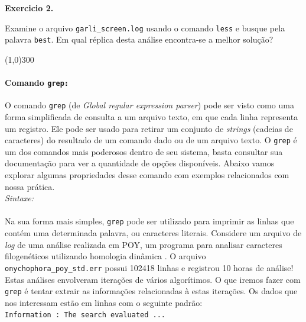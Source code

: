 \begin{refsection}
\begin{blackBlock}{\textbf{Exercicio 2.}}\label{tut2:ex:2.\arabic{ex}}

Examine o arquivo \texttt{garli\_screen.log} usando o comando \texttt{less} e busque pela palavra \texttt{best}. Em qual réplica desta análise encontra-se a melhor solução?
\begin{center}
\line(1,0){300}\\
\end{center}

\end{blackBlock}

\paragraph{Comando \texttt{grep:}}\label{tut2:text:editors:texttools:grep}

O comando \texttt{grep} (de \textit{Global regular expression parser}) pode ser visto como uma forma simplificada de consulta a um arquivo texto, em que cada linha representa um registro. Ele pode ser usado para retirar um conjunto de \textit{strings} (cadeias de caracteres) do resultado de um comando dado ou de um arquivo texto. O \texttt{grep} é um dos comandos mais poderosos dentro de seu sistema, basta consultar sua documentação para ver a quantidade de opções disponíveis. Abaixo vamos explorar algumas propriedades desse comando com exemplos relacionados com nossa prática.\\
\textit{Sintaxe:}\\
 \\

Na sua forma mais simples, \texttt{grep} pode ser utilizado para imprimir as linhas que contém uma determinada palavra, ou caracteres literais. Considere um arquivo de \textit{log} de uma análise realizada em POY, um programa para analisar caracteres filogenéticos utilizando homologia dinâmica \parencite{VaronETAL_2010}. O arquivo \texttt{onychophora\_poy\_std.err} possui 102418 linhas e registrou 10 horas de análise! Estas análises envolveram iterações de vários algorítimos. O que iremos fazer com \texttt{grep} é tentar extrair as informações relacionadas à estas iterações. Os dados que nos interessam estão em linhas com o seguinte padrão:\\

\texttt{Information : The search evaluated ...}\\


\end{refsection}
